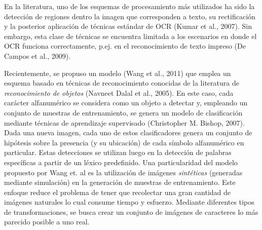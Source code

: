 	En la literatura, uno de los esquemas de procesamiento más utilizados ha sido la detección de regiones dentro la imagen que corresponden a texto, su rectificación y la posterior aplicación de técnicas estándar de OCR (Kumar et al., 2007). Sin embargo, esta clase de técnicas se encuentra limitada a los escenarios en donde el OCR funciona correctamente, p.ej. en el reconocimiento de texto impreso (De Campos et al., 2009).

	Recientemente, se propuso un modelo (Wang et al., 2011) que emplea un esquema basado en técnicas de reconocimiento conocidas de la literatura de \textit{reconocimiento de objetos} (Navneet Dalal et al., 2005). En este caso, cada carácter alfanumérico se considera como un objeto a detectar y, empleando un conjunto de muestras de entrenamiento, se genera un modelo de clasificación mediante técnicas de aprendizaje supervisado (Christopher M. Bishop, 2007). Dada una nueva imagen, cada uno de estos clasificadores genera un conjunto de hipótesis sobre la presencia (y su ubicación) de cada símbolo alfanumérico en particular. Estas detecciones se utilizan luego en la detección de palabras específicas a partir de un léxico predefinido. Una particularidad del modelo propuesto por Wang et. al es la utilización de imágenes \textit{sintéticas} (generadas mediante simulación) en la generación de muestras de entrenamiento. Este enfoque reduce el problema de tener que recolectar una gran cantidad de imágenes naturales lo cual consume tiempo y esfuerzo. Mediante diferentes tipos de transformaciones, se busca crear un conjunto de imágenes de caracteres lo más parecido posible a uno real.
	